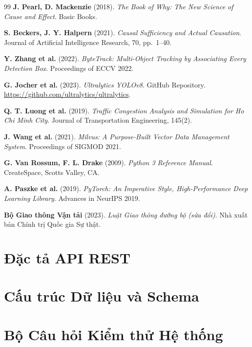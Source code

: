 \documentclass[12pt,a4paper]{report}
\begin{document}
\begin{thebibliography}{99}
\textbf{J. Pearl, D. Mackenzie} (2018).
\textit{The Book of Why: The New Science of Cause and Effect}.
Basic Books.

\textbf{S. Beckers, J. Y. Halpern} (2021).
\textit{Causal Sufficiency and Actual Causation}.
Journal of Artificial Intelligence Research, 70, pp.~1--40.

\textbf{Y. Zhang et al.} (2022).
\textit{ByteTrack: Multi-Object Tracking by Associating Every Detection Box}.
Proceedings of ECCV 2022.

\textbf{G. Jocher et al.} (2023).
\textit{Ultralytics YOLOv8}.
GitHub Repository. \url{https://github.com/ultralytics/ultralytics}.

\textbf{Q. T. Luong et al.} (2019).
\textit{Traffic Congestion Analysis and Simulation for Ho Chi Minh City}.
Journal of Transportation Engineering, 145(2).

\textbf{J. Wang et al.} (2021).
\textit{Milvus: A Purpose-Built Vector Data Management System}.
Proceedings of SIGMOD 2021.

\textbf{G. Van Rossum, F. L. Drake} (2009).
\textit{Python 3 Reference Manual}.
CreateSpace, Scotts Valley, CA.

\textbf{A. Paszke et al.} (2019).
\textit{PyTorch: An Imperative Style, High-Performance Deep Learning Library}.
Advances in NeurIPS 2019.

\textbf{Bộ Giao thông Vận tải} (2023).
\textit{Luật Giao thông đường bộ (sửa đổi)}.
Nhà xuất bản Chính trị Quốc gia Sự thật.

\end{thebibliography}

\appendix

\newpage
\chapter{Đặc tả API REST}


\newpage
\chapter{Cấu trúc Dữ liệu và Schema}


\newpage
\chapter{Bộ Câu hỏi Kiểm thử Hệ thống}

\end{document}
